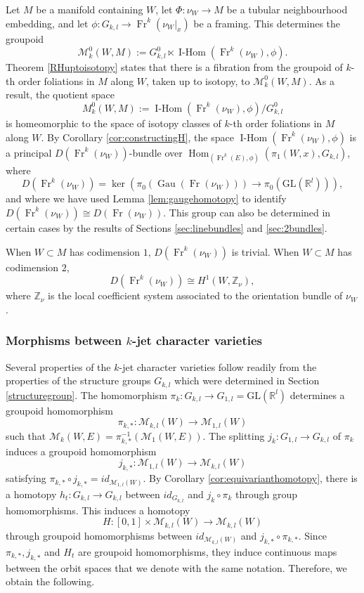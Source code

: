 \documentclass[10pt]{amsart}
\newcommand{\Hom}{\operatorname{Hom}}
\newcommand{\IsotopyObj}{{\operatorname{I-Hom}}}
\newcommand{\Fr}{{\operatorname{Fr}}}
\DeclareMathOperator{\Gau}{Gau}
\numberwithin{theoremalpha}{section}
\numberwithin{equation}{section}
\numberwithin{definition}{section}
\numberwithin{theorem}{section}
\numberwithin{proposition}{section}
\numberwithin{lemma}{section}
\numberwithin{example}{section}
\numberwithin{remark}{section}
\numberwithin{corollary}{section}
\numberwithin{question}{section}
\numberwithin{problem}{section}
\numberwithin{assumption}{section}
\theoremstyle{named}
\numberwithin{equation}{section}
\begin{document}
Let $M$ be a manifold containing $W$, let $\Phi : \nu_{W} \to M$ be a tubular neighbourhood embedding, and let $\phi : G_{k,l} \to \Fr^k(\nu_{W}|_{x})$ be a framing. This determines the groupoid 
\[
\mathcal{M}_{k}^{0}(W,M) := G_{k,l}^0 \ltimes \IsotopyObj(\Fr^k(\nu_{W}),\phi).
\]
Theorem \ref{RHuptoisotopy} states that there is a fibration from the groupoid of $k$-th order foliations in $M$ along $W$, taken up to isotopy, to $\mathcal{M}_{k}^{0}(W,M)$. As a result, the quotient space 
\[
M_{k}^{0}(W,M) := \IsotopyObj(\Fr^k(\nu_{W}),\phi)/G_{k,l}^{0}
\]
is homeomorphic to the space of isotopy classes of $k$-th order foliations in $M$ along $W$. By Corollary \ref{cor:constructingH}, the space $\IsotopyObj(\Fr^k(\nu_{W}),\phi)$ is a principal $D(\Fr^k(\nu_{W}))$-bundle over $\Hom_{(\Fr^k(E),\phi)}(\pi_1(W,x),G_{k,l})$, where 
\[ D(\Fr^k(\nu_{W})) = \ker(\pi_0(\Gau(\Fr(\nu_{W}))) \rightarrow \pi_0(\mathrm{GL}(\mathbb{R}^l))), \]
and where we have used Lemma \ref{lem:gaugehomotopy} to identify $ D(\Fr^k(\nu_{W})) \cong  D(\Fr(\nu_{W}))$. This group can also be determined in certain cases by the results of Sections \ref{sec:linebundles} and \ref{sec:2bundles}. 
\begin{lemma} \label{lem:Dprincbundle}
When $W \subset M$ has codimension $1$, $D(\Fr^k(\nu_{W}))$ is trivial. When $W \subset M$ has codimension $2$, 
\[
D(\Fr^k(\nu_{W})) \cong H^{1}(W, \mathbb{Z}_{\nu}),
\]
where $\mathbb{Z}_{\nu}$ is the local coefficient system associated to the orientation bundle of $\nu_{W}$. 
\end{lemma}

\subsubsection{Morphisms between $k$-jet character varieties}
Several properties of the $k$-jet character varieties follow readily from the properties of the structure groups $G_{k,l}$ which were determined in Section \ref{structuregroup}. The homomorphism $\pi_{k} : G_{k,l} \to G_{1,l} = \mathrm{GL}(\mathbb{R}^l)$ determines a groupoid homomorphism 
\[
\pi_{k,*} : \mathcal{M}_{k,l}(W) \to \mathcal{M}_{1,l}(W)
\]
such that $\mathcal{M}_{k}(W, E) = \pi_{k,*}^{-1}(\mathcal{M}_{1}(W, E))$. The splitting $j_{k}: G_{1,l} \to G_{k,l}$ of $\pi_{k}$ induces a groupoid homomorphism 
\[
j_{k, *} : \mathcal{M}_{1,l}(W) \to  \mathcal{M}_{k,l}(W) 
\]
satisfying $\pi_{k,*} \circ j_{k, *} = id_{ \mathcal{M}_{1,l}(W) }$. By Corollary \ref{cor:equivarianthomotopy}, there is a homotopy $h_{t}: G_{k,l} \to G_{k,l}$ between $id_{G_{k,l}}$ and $j_{k} \circ \pi_{k}$ through group homomorphisms. This induces a homotopy 
\[
H: [0,1] \times \mathcal{M}_{k,l}(W) \to \mathcal{M}_{k,l}(W) 
\] 
through groupoid homomorphisms between  $id_{ \mathcal{M}_{k,l}(W) }$ and $j_{k, *} \circ \pi_{k,*} $. Since $\pi_{k,*}, j_{k, *}$ and $H_t$ are groupoid homomorphisms, they induce continuous maps between the orbit spaces that we denote with the same notation. Therefore, we obtain the following. 
\end{document}
